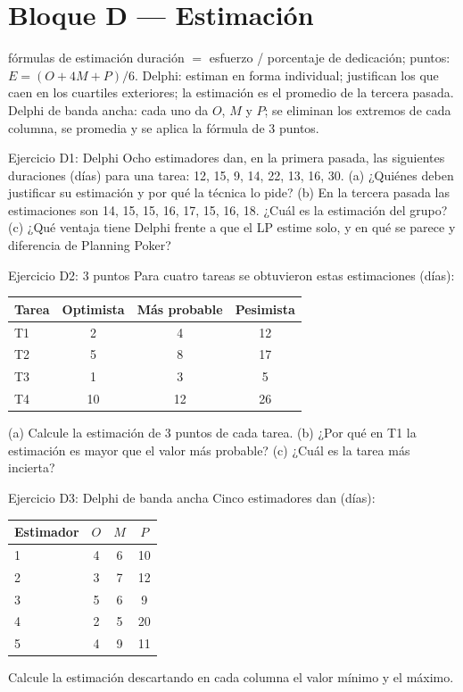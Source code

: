 \documentclass[11pt,a4paper]{article}
\begin{document}
\section{Bloque D --- Estimación}
\begin{plantilla}{fórmulas de estimación}
duración $=$ esfuerzo / porcentaje de dedicación;  puntos: $E = (O + 4M + P)/6$.
Delphi: estiman en forma individual; justifican los que caen en los cuartiles exteriores; la estimación es el
promedio de la tercera pasada. Delphi de banda ancha: cada uno da $O$, $M$ y $P$; se eliminan los extremos de cada
columna, se promedia y se aplica la fórmula de 3 puntos.
\end{plantilla}
\begin{enunciado}{Ejercicio D1: Delphi}
Ocho estimadores dan, en la primera pasada, las siguientes duraciones (días) para una tarea: 12, 15, 9, 14, 22,
13, 16, 30. (a) ¿Quiénes deben justificar su estimación y por qué la técnica lo pide? (b) En la tercera pasada
las estimaciones son 14, 15, 15, 16, 17, 15, 16, 18. ¿Cuál es la estimación del grupo? (c) ¿Qué ventaja tiene
Delphi frente a que el LP estime solo, y en qué se parece y diferencia de Planning Poker?
\end{enunciado}
\begin{enunciado}{Ejercicio D2: 3 puntos}
Para cuatro tareas se obtuvieron estas estimaciones (días):
\begin{center}\small
\begin{tabular}{lccc}
\toprule
Tarea & Optimista & Más probable & Pesimista\\
\midrule
T1 & 2 & 4 & 12\\
T2 & 5 & 8 & 17\\
T3 & 1 & 3 & 5\\
T4 & 10 & 12 & 26\\
\bottomrule
\end{tabular}
\end{center}
(a) Calcule la estimación de 3 puntos de cada tarea. (b) ¿Por qué en T1 la estimación es mayor que el valor más
probable? (c) ¿Cuál es la tarea más incierta?
\end{enunciado}
\begin{enunciado}{Ejercicio D3: Delphi de banda ancha}
Cinco estimadores dan (días):
\begin{center}\small
\begin{tabular}{lccc}
\toprule
Estimador & $O$ & $M$ & $P$\\
\midrule
1 & 4 & 6 & 10\\
2 & 3 & 7 & 12\\
3 & 5 & 6 & 9\\
4 & 2 & 5 & 20\\
5 & 4 & 9 & 11\\
\bottomrule
\end{tabular}
\end{center}
Calcule la estimación descartando en cada columna el valor mínimo y el máximo.
\end{enunciado}
\end{document}
